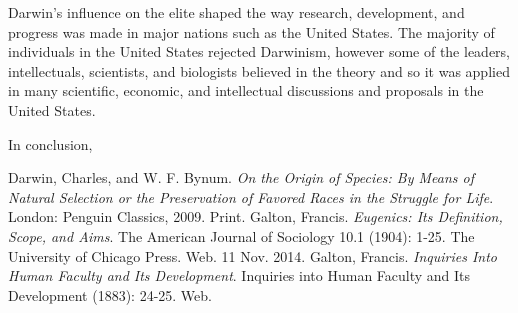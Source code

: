 \documentclass[11pt, oneside]{article}
\begin{document}
\par Darwin's influence on the elite shaped the way research, development, and progress was made in major nations such as the United States. The majority of individuals in the United States rejected Darwinism, however some of the leaders, intellectuals, scientists, and biologists believed in the theory and so it was applied in many scientific, economic, and intellectual discussions and proposals in the United States. 

\par In conclusion, 

\begin{thebibliography}{9}
  Darwin, Charles, and W. F. Bynum.
  \emph{On the Origin of Species: By Means of Natural Selection or the Preservation of Favored Races in the Struggle for Life}.
  London: Penguin Classics, 2009.
  Print.
  Galton, Francis.
  \emph{Eugenics: Its Definition, Scope, and Aims}.
  The American Journal of Sociology 10.1 (1904): 1-25.
  The University of Chicago Press. Web. 11 Nov. 2014.
  Galton, Francis.
  \emph{Inquiries Into Human Faculty and Its Development}.
  Inquiries into Human Faculty and Its Development (1883): 24-25. 
  Web.
\end{thebibliography}
\end{document}
